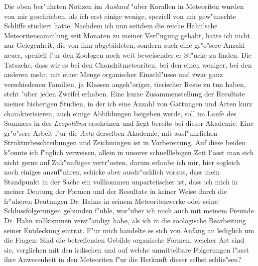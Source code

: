 \documentclass[a4paper, 12pt, oneside]{article}
\begin{document}
Die oben ber"uhrten Notizen im \emph{Ausland} "uber Korallen in Meteoriten wurden von mir geschrieben, als ich erst einige wenige, speziell von mir gew"unschte Schliffe studiert hatte. Nachdem ich nun seitdem die reiche Hahn'sche Meteoritensammlung seit Monaten zu meiner Verf"ugung gehabt, hatte ich nicht nur Gelegenheit, die von ihm abgebildeten, sondern auch eine gr"o"sere Anzahl neuer, speziell f"ur den Zoologen noch weit beweisender er St"ucke zu finden. Die Tatsache, dass wir es bei den Chondritmeteoriten, bei den einen weniger, bei den anderen mehr, mit einer Menge organischer Einschl"usse und zwar ganz verschiedenen Familien, ja Klassen angeh"origer, tierischer Reste zu tun haben, steht "uber jeden Zweifel erhaben. Eine kurze Zusammenstellung der Resultate meiner bisherigen Studien, in der ich eine Anzahl von Gattungen und Arten kurz charakterisieren, auch einige Abbildungen beigeben werde, soll im Laufe des Sommers in der \emph{Leopoldina} erscheinen und liegt bereits bei dieser Akademie. Eine gr"o"sere Arbeit f"ur die \emph{Acta} derselben Akademie, mit ausf"uhrlichen Strukturbeschreibungen und Zeichnungen ist in Vorbereitung. Auf diese beiden k"onnte ich f"uglich verweisen, allein in unserer schnelllebigen Zeit l"asst man sich nicht gerne auf Zuk"unftiges vertr"osten, darum erlaube ich mir, hier sogleich noch einiges anzuf"uhren, schicke aber ausdr"ucklich voraus, dass mein Standpunkt in der Sache ein vollkommen unparteiischer ist, dass ich mich in meiner Deutung der Formen und der Resultate in keiner Weise durch die fr"uheren Deutungen Dr. Hahns in seinem Meteoritenwerke oder seine Schlussfolgerungen gebunden f"uhle, wor"uber ich mich auch mit meinem Freunde Dr. Hahn vollkommen verst"andigt habe, als ich in die zoologische Bearbeitung seiner Entdeckung eintrat. F"ur mich handelte es sich von Anfang an lediglich um die Fragen: Sind die betreffenden Gebilde organische Formen, welcher Art sind sie, verglichen mit den irdischen und auf welche unmittelbare Folgerungen l"asst ihre Anwesenheit in den Meteoriten f"ur die Herkunft dieser selbst schlie"sen?
\end{document}
